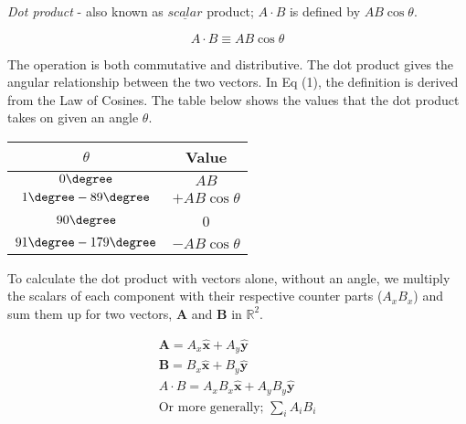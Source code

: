 
	\rhead{\today} 
	
	\emph{Dot product} - also known as $\underline{scalar}$ product; \( A \cdot B \) is defined by \( AB\cos{\theta} \).
	
	\begin{equation}
	A \cdot B \equiv AB\cos{\theta}
	\end{equation}
	
	The operation is both commutative and distributive. The dot product gives the angular relationship between the two vectors. In Eq (1), the definition is derived from the Law of Cosines. The table below shows the values that the dot product takes on given an angle \( \theta \).
	
	\bigskip


	
	\begin{center}
	\begin{tabular}{|c|c|}
		\hline
		$\theta$ & Value \\
		\hline
		$0\degree $ & $AB$ \\
		\hline
		$1\degree-89\degree$ & $+AB\cos{\theta}$ \\
		\hline
		$90\degree $ & 0 \\
		\hline
		$91\degree - 179 \degree$ & $-AB\cos{\theta}$ \\
		\hline
	\end{tabular}
	\end{center}


	\bigskip
	
	To calculate the dot product with vectors alone, without an angle, we multiply the scalars of each component with their respective counter parts (\( A_xB_x \)) and sum them up for two vectors, \(\mathbf{A} \) and \( \mathbf{ B} \) in \( \mathbb{R}^2\).
	
	
	\begin{equation}
		\begin{gathered}
		\mathbf{ A} = A_x\mathbf{\hat{x}} + A_y\mathbf{\hat{y}} \\
		\mathbf{ B} = B_x\mathbf{\hat{x}} + B_y\mathbf{\hat{y}} \\
		A\cdot B = A_xB_x\mathbf{\hat{x}} + A_yB_y\mathbf{\hat{y}} \\
		\text{Or more generally; } \sum_{i} A_i B_i 
		\end{gathered}
	\end{equation}
	

